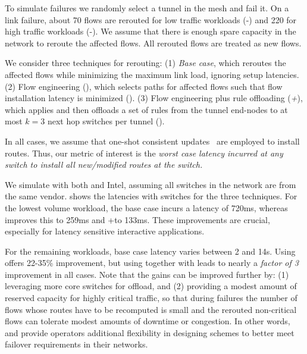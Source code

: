 

To simulate failures we randomly select a tunnel in the mesh and fail it.  On
a link failure, about 70 flows are rerouted for low traffic workloads
(\sA-\sC) and 220 for high traffic workloads (\sD-\sF).  We assume that there
is enough spare capacity in the network to reroute the affected flows. All
rerouted flows are treated as new flows.  

We consider three techniques for rerouting: (1) {\em Base case}, which
reroutes the affected flows while minimizing the maximum link load, ignoring
setup latencies.
(2) Flow engineering ({\em \FE}), which selects paths for affected flows such
that flow installation latency is minimized (). (3) Flow
engineering plus rule offloading ({\em \FE+\RO}), which applies \FE and
then offloads a set of rules from the tunnel end-nodes to at most $k=3$ next
hop switches per tunnel (). 

In all cases, we assume that one-shot consistent updates~\cite{one-shot} are employed to install routes. Thus, our metric of interest is the {\em worst case latency incurred at any switch to install all new/modified routes at the switch.}

We simulate with both \BroadcomOne and Intel, assuming all switches in the
network are from the same vendor.  shows the
latencies with \BroadcomOne switches for the three techniques. For the lowest
volume workload, the base case incurs a latency of 720ms, whereas \FE improves
this to 259ms and \FE+\RO to 133ms. These improvements are crucial, especially
for latency sensitive interactive applications.

For the remaining workloads, base case latency varies between 2 and 14s.
Using \FE offers 22-35\% improvement, but using \FE together with \RO leads to
nearly a {\em factor of 3} improvement in all cases. Note that the gains can
be improved further by: (1) leveraging more core switches for offload, and (2)
providing a modest amount of reserved capacity for highly critical traffic,
so that during failures the number of flows whose routes have to be
recomputed is small and the rerouted non-critical flows can tolerate modest
amounts of downtime or congestion. In other words, 
\FE and \RO provide operators
additional flexibility in designing schemes to better meet failover
requirements in their networks. 

